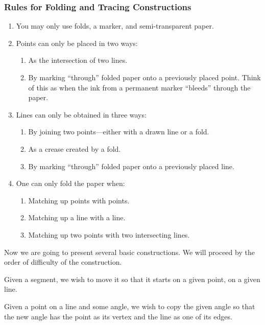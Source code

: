 \subsubsection*{Rules for Folding and Tracing Constructions}
\begin{enumerate}
\item You may only use folds, a marker, and semi-transparent paper.
\item Points can only be placed in two ways:
\begin{enumerate}
\item As the intersection of two lines. 
\item By marking ``through'' folded paper onto a previously placed
  point. Think of this as when the ink from a permanent marker
  ``bleeds'' through the paper.
\end{enumerate}
\item Lines can only be obtained in three ways:
\begin{enumerate}
\item By joining two points---either with a drawn line or a fold.
\item As a crease created by a fold. 
\item By marking ``through'' folded paper onto a previously placed
  line.
\end{enumerate}
\item One can only fold the paper when:
\begin{enumerate}
\item Matching up points with points.
\item Matching up a line with a line.
\item Matching up two points with two intersecting lines.
\end{enumerate}
\end{enumerate}


Now we are going to present several basic constructions. We will
proceed by the order of difficulty of the construction.


\begin{con}  
Given a segment, we wish to move it so that it starts on a given
point, on a given line.
\end{con}


\begin{con} 
Given a point on a line and some angle, we wish to copy the given
angle so that the new angle has the point as its vertex and the line
as one of its edges.
\end{con}

